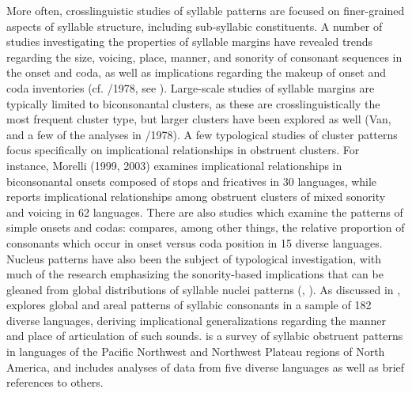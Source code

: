   More often, crosslinguistic studies of syllable patterns are focused on finer-grained aspects of syllable structure, including sub-syllabic constituents. A number of studies investigating the properties of syllable margins have revealed trends regarding the size, voicing, place, manner, and sonority of consonant sequences in the onset and coda, as well as implications regarding the makeup of onset and coda inventories (cf. \citealt{Greenberg1965}/1978, see ). Large-scale studies of syllable margins are typically limited to biconsonantal clusters, as these are crosslinguistically the most frequent cluster type, but larger clusters have been explored as well (Van\citealt{Dam2004}, and a few of the analyses in \citealt{Greenberg1965}/1978). A few typological studies of cluster patterns focus specifically on implicational relationships in obstruent clusters. For instance, Morelli (1999, 2003) examines implicational relationships in biconsonantal onsets composed of stops and fricatives in 30 languages, while \citet{Kreitman2008} reports implicational relationships among obstruent clusters of mixed sonority and voicing in 62 languages. There are also studies which examine the patterns of simple onsets and codas: \citet{Rousset2004} compares, among other things, the relative proportion of consonants which occur in onset versus coda position in 15 diverse languages. Nucleus patterns have also been the subject of typological investigation, with much of the research emphasizing the sonority-based implications that can be gleaned from global distributions of syllable nuclei patterns (\citealt{Blevins1995}, \citealt{Zec2007}). As discussed in , \citet{Bell1978a} explores global and areal patterns of syllabic consonants in a sample of 182 diverse languages, deriving implicational generalizations regarding the manner and place of articulation of such sounds. \citet{Hoard1978} is a survey of syllabic obstruent patterns in languages of the Pacific Northwest and Northwest Plateau regions of North America, and includes analyses of data from five diverse languages as well as brief references to others.

